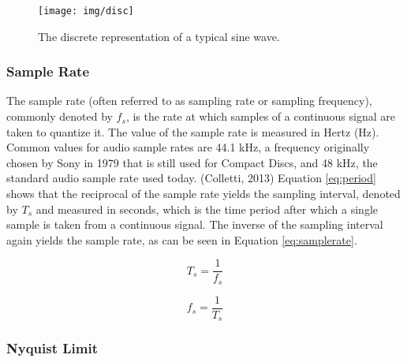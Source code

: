\begin{figure}[h!]

  \centering

  \texttt{[image: img/disc]}

  \caption{The discrete representation of a typical sine wave.}

  \label{fig:disc}

\end{figure}

\subsubsection{Sample Rate}

The sample rate (often referred to as sampling rate or sampling frequency), commonly denoted by $f_{s}$, is the rate at which samples of a continuous signal are taken to quantize it. The value of the sample rate is measured in Hertz (Hz). Common values for audio sample rates are 44.1 kHz, a frequency originally chosen by Sony in 1979 that is still used for Compact Discs, and 48 kHz, the standard audio sample rate used today.  (Colletti, 2013) Equation \ref{eq:period} shows that the reciprocal of the sample rate yields the sampling interval, denoted by $T_{s}$ and measured in seconds, which is the time period after which a single sample is taken from a continuous signal. The inverse of the sampling interval again yields the sample rate, as can be seen in Equation \ref{eq:samplerate}.

\begin{multicols}{2}

  \begin{equation}
     T_{s} = \frac{1}{f_{s}}
     \label{eq:period}
  \end{equation}

  \begin{equation}
    f_{s} = \frac{1}{T_{s}}
    \label{eq:samplerate}
  \end{equation}

\end{multicols}

\pagebreak

\subsubsection{Nyquist Limit}

